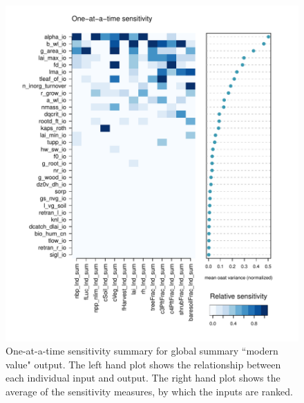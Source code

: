 \documentclass[gmd, manuscript]{copernicus}
\begin{document}
\begin{figure}[t]
\includegraphics[width=12cm]{./figs/fig09.pdf}
\caption{One-at-a-time sensitivity summary for global summary ``modern value" output. The left hand plot shows the relationship between each individual input and output. The right hand plot shows the average of the sensitivity measures, by which the inputs are ranked. }
\label{fig:oat_var_sensmat_level1a_wave01_Y}
\end{figure}
\end{document}
